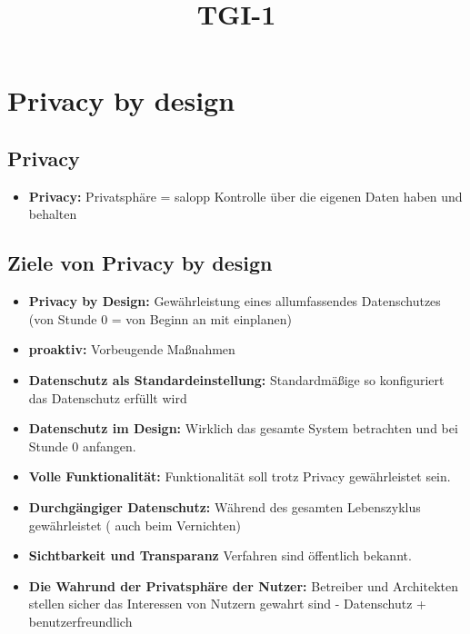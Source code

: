 \documentclass[a4paper,10pt]{scrartcl}
\title{TGI-1}
\author{}
\begin{document}
\section{Privacy by design}

\subsection{Privacy}

\begin{itemize}
 \item \textbf{Privacy:} Privatsphäre = salopp Kontrolle über die eigenen Daten haben
und behalten 
\end{itemize}


\subsection{Ziele von Privacy by design}
\begin{itemize}
 \item \textbf{Privacy by Design: } Gewährleistung eines allumfassendes Datenschutzes  (von Stunde 0 = von Beginn an mit einplanen)
 \item \textbf{proaktiv: } Vorbeugende Maßnahmen 
 \item \textbf{Datenschutz als Standardeinstellung: } Standardmäßige so konfiguriert das Datenschutz erfüllt wird  
 \item \textbf{Datenschutz im Design: } Wirklich das gesamte System betrachten und bei Stunde 0 anfangen.
 \item \textbf{Volle Funktionalität: } Funktionalität soll trotz Privacy gewährleistet sein.
 \item \textbf{Durchgängiger Datenschutz: } Während des gesamten Lebenszyklus gewährleistet ( auch beim Vernichten)
 \item \textbf{Sichtbarkeit und Transparanz} Verfahren sind öffentlich bekannt.
 \item \textbf{ Die Wahrund der Privatsphäre der Nutzer:} Betreiber und Architekten stellen sicher das Interessen von Nutzern gewahrt sind - 
 Datenschutz + benutzerfreundlich 
\end{itemize}
\end{document}
